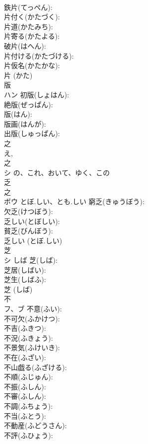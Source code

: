 \documentclass[8pt]{extreport}
\begin{document}
\begin{CJK}{UTF8}{min}
\\	鉄片(てっぺん): 
\\	片付く(かたづく): 
\\	片道(かたみち): 
\\	片寄る(かたよる): 
\\	破片(はへん): 
\\	片付ける(かたづける): 
\\	片仮名(かたかな): 
\\	片 (かた)
\\	版			
\\	ハン		初版(しょはん): 
\\	絶版(ぜっぱん): 
\\	版(はん): 
\\	版画(はんが): 
\\	出版(しゅっぱん): 
\\	之			
\\	え, 
\\	之
\\	シ	の、これ、おいて、ゆく、この		
\\	乏			
\\	之 
\\	ボウ	とぼ.しい、とも.しい	窮乏(きゅうぼう): 
\\	欠乏(けつぼう): 
\\	乏しい(とぼしい): 
\\	貧乏(びんぼう): 
\\	乏しい (とぼ.しい)
\\	芝			
\\	シ	しば	芝(しば): 
\\	芝居(しばい): 
\\	芝生(しばふ): 
\\	芝 (しば)
\\	不			
\\	フ、ブ		不意(ふい): 
\\	不可欠(ふかけつ): 
\\	不吉(ふきつ): 
\\	不況(ふきょう): 
\\	不景気(ふけいき): 
\\	不在(ふざい): 
\\	不山戯る(ふざける): 
\\	不順(ふじゅん): 
\\	不振(ふしん): 
\\	不審(ふしん): 
\\	不調(ふちょう): 
\\	不当(ふとう): 
\\	不動産(ふどうさん): 
\\	不評(ふひょう): 

\end{CJK}
\end{document}
